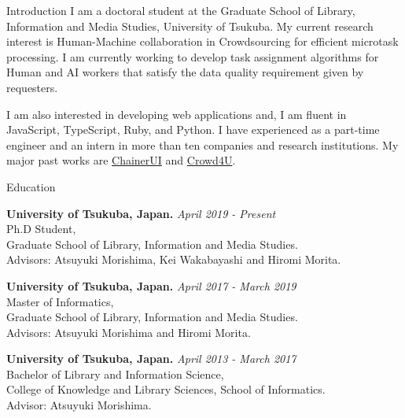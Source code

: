 \documentclass{resume} %
\begin{document}
\begin{rSection}{Introduction}
I am a doctoral student at the Graduate School of Library, Information and Media Studies, University of Tsukuba.
My current research interest is Human-Machine collaboration in Crowdsourcing for efficient microtask processing.
I am currently working to develop task assignment algorithms for Human and AI workers that satisfy the data quality requirement given by requesters.

I am also interested in developing web applications and, I am fluent in JavaScript, TypeScript, Ruby, and Python.
I have experienced as a part-time engineer and an intern in more than ten companies and research institutions.
My major past works are \href{https://github.com/chainer/chainerui}{ChainerUI} and \href{https://crowd4u.org}{Crowd4U}.
\end{rSection}



\begin{rSection}{Education}

{\bf University of Tsukuba, Japan. } \hfill {\em April 2019 - Present}
\\ Ph.D Student,
\\ Graduate School of Library, Information and Media Studies.
\\ Advisors: Atsuyuki Morishima, Kei Wakabayashi and Hiromi Morita.

{\bf University of Tsukuba, Japan. } \hfill {\em April 2017 - March 2019}
\\ Master of Informatics,
\\ Graduate School of Library, Information and Media Studies.
\\ Advisors: Atsuyuki Morishima and Hiromi Morita.

{\bf University of Tsukuba, Japan. } \hfill {\em April 2013 - March 2017} 
\\ Bachelor of Library and Information Science,
\\ College of Knowledge and Library Sciences, School of Informatics.
\\ Advisor: Atsuyuki Morishima.
\end{rSection}
\end{document}
